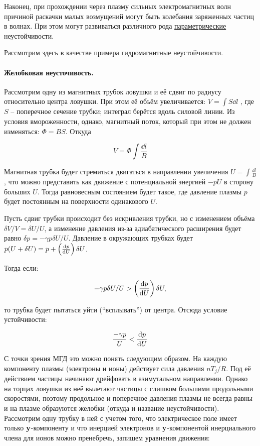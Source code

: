 \documentclass[10pt, a4paper]{article}
\begin{document}
Наконец, при прохождении через плазму сильных электромагнитных волн причиной раскачки малых возмущений могут быть колебания заряженных частиц в волнах. При этом могут развиваться различного рода \uline{параметрические} неустойчивости.

Рассмотрим здесь в качестве примера \uline{гидромагнитные} неустойчивости.

\paragraph{Желобковая неусточивость.}

Рассмотрим одну из магнитных трубок ловушки и её сдвиг по радиусу относительно центра ловушки. При этом её объём увеличивается: $V=\int S \dd{l}$ , где $S$ -- поперечное сечение трубки; интеграл берётся вдоль силовой линии. Из условия вмороженности, однако, магнитный поток, который при этом не должен изменяться: $\Phi = BS$. Откуда

\begin{equation*}
	V=\Phi \int \frac{\dd{l}}{B}
\end{equation*}

Магнитная трубка будет стремиться двигаться в направлении увеличения $U=\int \frac{\dd{l}}{B}$, что можно представить как движение с потенциальной энергией $-pU$ в сторону больших $U$. Тогда равновесным состоянием будет такое, где давление плазмы $p$ будет постоянным на поверхности одинакового $U$.

Пусть сдвиг трубки происходит без искривления трубки, но с изменением объёма $\delta V/V=\delta U/U$, а изменение давления из-за адиабатического расширения будет равно $\delta p = -\gamma p \delta U/U$. Давление в окружающих трубках будет $p(U+\delta U)=p+\left(\dv{p}{U}\right)\delta U$.

Тогда если:

\begin{equation*}
	-\gamma p \delta U/U > \left(\dv{p}{U}\right) \delta U,
\end{equation*}

то трубка будет пытаться уйти (``всплывать'') от центра. Отсюда условие устойчивости:

\begin{equation*}
	\frac{ -\gamma p}{U} < \dv{p}{U}
\end{equation*}

С точки зрения МГД это можно понять следующим образом. На каждую компоненту плазмы (электроны и ионы) действует сила давления $nT_j /R$. Под её действием частицы начинают дрейфовать в азимутальном направлении. Однако на торцах ловушки из неё вылетают частицы с слишком большими продольными скоростями, поэтому продольное и поперечное давления плазмы не всегда равны и на плазме образуются желобки (откуда и название неустойчивости). Рассмотрим одну трубку в ней с учетом того, что электрическое поле имеет только $\vb{y}$-компоненту и что инерцией электронов и $\vb{y}$-компонентой инерциального члена для ионов можно пренебречь, запишем уравнения движения:
\end{document}
